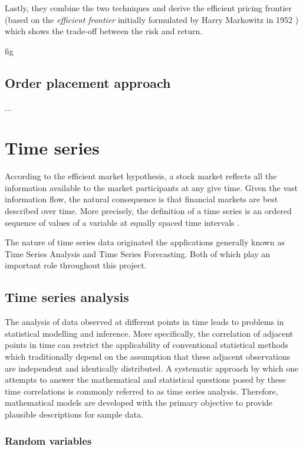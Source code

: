 Lastly, they combine the two techniques and derive the efficient pricing frontier (based on the \textit{efficient frontier} initially formulated by Harry Markowitz in 1952 \cite{markowitz1952portfolio}) which shows the trade-off between the risk and return.

fig

\subsection{Order placement approach}

...


\section{Time series}

According to the efficient market hypothesis\cite{malkiel1989efficient}, a stock market reflects all the information available to the market participants at any give time. 
Given the vast information flow, the natural consequence is that financial markets are best described over time. 
More precisely, the definition of a time series is an ordered sequence of values of a variable at equally spaced time intervals \cite{intro-timeseries}.

The nature of time series data originated the applications generally known as Time Series Analysis and Time Series Forecasting. 
Both of which play an important role throughout this project.

\subsection{Time series analysis}

The analysis of data observed at different points in time leads to problems in statistical modelling and inference. 
More specifically, the correlation of adjacent points in time can restrict the applicability of conventional statistical methods which traditionally depend on the assumption that these adjacent observations are independent and identically distributed. 
A systematic approach by which one attempts to answer the mathematical and statistical questions posed by these time correlations is commonly referred to as time series analysis. 
Therefore, mathematical models are developed with the primary objective to provide plausible descriptions for sample data. \cite{shumway2000time}

\subsubsection{Random variables}

